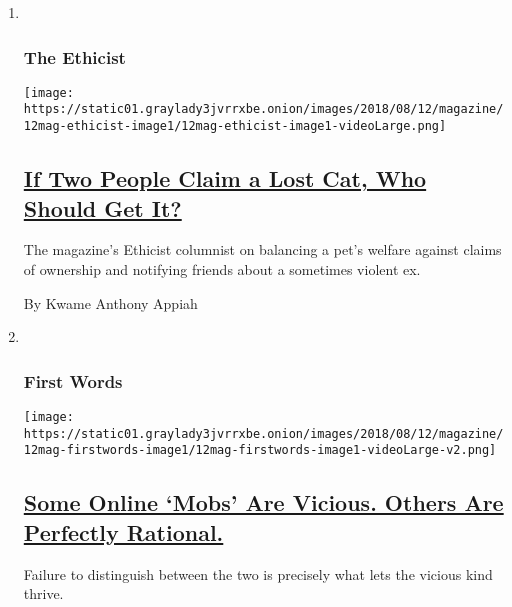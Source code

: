 \begin{enumerate}
\def\labelenumi{\arabic{enumi}.}
\item ~
  \hypertarget{the-ethicist}{%
  \subsubsection{The Ethicist}\label{the-ethicist}}

  \texttt{[image: https://static01.graylady3jvrrxbe.onion/images/2018/08/12/magazine/12mag-ethicist-image1/12mag-ethicist-image1-videoLarge.png]}

  \hypertarget{if-two-people-claim-a-lost-cat-who-should-get-it}{%
  \subsection{\texorpdfstring{\href{/2018/08/07/magazine/if-two-people-claim-a-lost-cat-who-should-get-it.html}{If
  Two People Claim a Lost Cat, Who Should Get
  It?}}{If Two People Claim a Lost Cat, Who Should Get It?}}\label{if-two-people-claim-a-lost-cat-who-should-get-it}}

  The magazine's Ethicist columnist on balancing a pet's welfare against
  claims of ownership and notifying friends about a sometimes violent
  ex.

  By Kwame Anthony Appiah
\item ~
  \hypertarget{first-words}{%
  \subsubsection{First Words}\label{first-words}}

  \texttt{[image: https://static01.graylady3jvrrxbe.onion/images/2018/08/12/magazine/12mag-firstwords-image1/12mag-firstwords-image1-videoLarge-v2.png]}

  \hypertarget{some-online-mobs-are-vicious-others-are-perfectly-rational}{%
  \subsection{\texorpdfstring{\href{/2018/08/07/magazine/some-online-mobs-are-vicious-others-are-perfectly-rational.html}{Some
  Online `Mobs' Are Vicious. Others Are Perfectly
  Rational.}}{Some Online `Mobs' Are Vicious. Others Are Perfectly Rational.}}\label{some-online-mobs-are-vicious-others-are-perfectly-rational}}

  Failure to distinguish between the two is precisely what lets the
  vicious kind thrive.


\end{enumerate}
